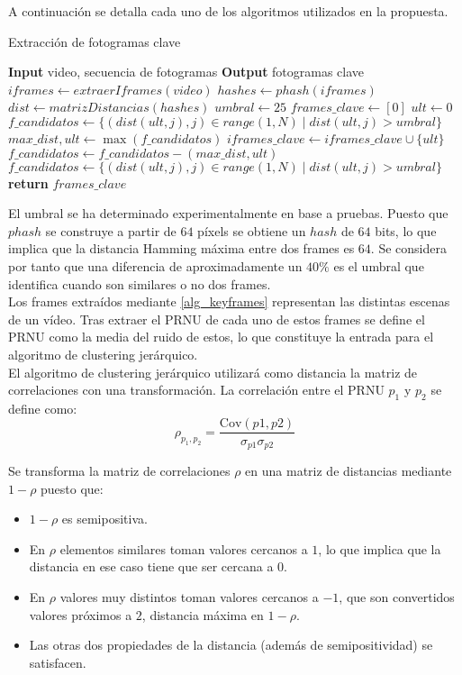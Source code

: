A continuación se detalla cada uno de los algoritmos utilizados en la propuesta.

\begin{algorithm}
\caption{Extracción de fotogramas clave}
\label{alg_keyframes}
\begin{algorithmic}[1]
\Statex \textbf{Input} video, secuencia de fotogramas
\Statex \textbf{Output} fotogramas clave
\State $iframes \gets extraerIframes(video)$
\State $hashes \gets phash(iframes)$
\State $dist \gets matrizDistancias(hashes)$
\State $umbral \gets 25$ 
\State $frames\_clave \gets [0]$
\State $ult \gets 0$ 
\State $f\_candidatos \gets \{(dist(ult,j), j)\in range(1,N) \; | \; dist(ult, j) > umbral\}$ 
   \State $max\_dist, ult \gets \max({f\_candidatos})$
   \State $iframes\_clave \gets iframes\_clave \cup \{ult\}$
   \State $f\_candidatos \gets f\_candidatos - (max\_dist, ult)$
   \State $f\_candidatos \gets \{(dist(ult,j), j)\in range(1,N) \; | \; dist(ult, j) > umbral\}$ 
\EndWhile
\State \textbf{return} $frames\_clave$
\end{algorithmic}
\end{algorithm}

El umbral se ha determinado experimentalmente en base a pruebas. Puesto que $phash$ se construye a partir de $64$ píxels se obtiene un $hash$ de $64$ bits, lo que implica que la distancia Hamming máxima entre dos frames es $64$. Se considera por tanto que una diferencia de aproximadamente un $40\%$ es el umbral que identifica cuando son similares o no dos frames. \\

Los frames extraídos mediante \ref{alg_keyframes} representan las distintas escenas de un vídeo. Tras extraer el PRNU de cada uno de estos frames se define el PRNU como la media del ruido de estos, lo que constituye la entrada para el algoritmo de clustering jerárquico. \\

El algoritmo de clustering jerárquico utilizará como distancia la matriz de correlaciones con una transformación. La correlación entre el PRNU $p_1$ y $p_2$ se define como:
\begin{equation}
\rho_{p_1,p_2} = \frac{\displaystyle \mathrm{Cov}(p1, p2)}{\displaystyle \sigma_{p1}\sigma_{p2}} \nonumber
\end{equation}

Se transforma la matriz de correlaciones $\rho$ en una matriz de distancias mediante $1-\rho$ puesto que:
\begin{itemize}
\item $1-\rho$ es semipositiva.
\item En $\rho$ elementos similares toman valores cercanos a $1$, lo que implica que la distancia en ese caso tiene que ser cercana a $0$.
\item En $\rho$ valores muy distintos toman valores cercanos a $-1$, que son convertidos valores próximos a $2$, distancia máxima en $1-\rho$.
\item Las otras dos propiedades de la distancia (además de semipositividad) se satisfacen.
\end{itemize}
